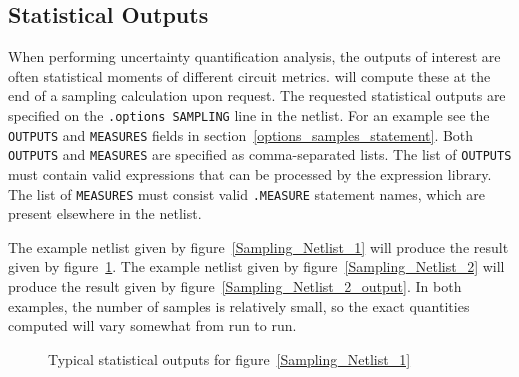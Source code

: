 \subsection{Statistical Outputs}
\label{statistical_outputs}
When performing uncertainty quantification analysis, the outputs of interest are 
often statistical moments of different circuit metrics.   \Xyce{} will compute these at the
end of a sampling calculation upon request.  The requested statistical outputs are 
specified on the \texttt{.options SAMPLING} line in the netlist.  For an example 
see the \texttt{OUTPUTS} and \texttt{MEASURES} fields in section~\ref{options_samples_statement}.  
Both \texttt{OUTPUTS} and \texttt{MEASURES} are specified as comma-separated 
lists.  The list of \texttt{OUTPUTS} must contain valid expressions that can be 
processed by the \Xyce{} expression library.  The list of \texttt{MEASURES} must 
consist valid \texttt{.MEASURE} statement names, which are present elsewhere in 
the netlist.

The example netlist given by figure~\ref{Sampling_Netlist_1} will produce the result 
given by figure~\ref{Sampling_Netlist_1_output}.  The example netlist given 
by figure~\ref{Sampling_Netlist_2} will produce the result given by 
figure~\ref{Sampling_Netlist_2_output}.  In both examples, the number of samples 
is relatively small, so the exact quantities computed will vary somewhat from run to run.
\begin{figure}[htbp]
\begin{centering}
\caption{Typical statistical outputs for figure~\ref{Sampling_Netlist_1}}
\label{Sampling_Netlist_1_output}
\end{centering}
\end{figure}

